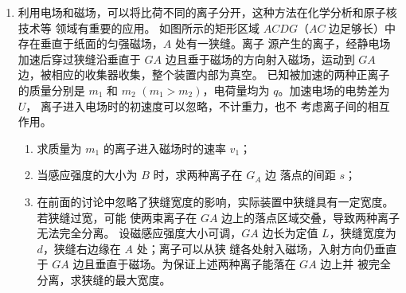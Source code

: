 \begin{enumerate}
\begin{enumerate}
	

\end{enumerate}
\begin{figure}[h!]
	\flushright
	
\end{figure}







\item
{}
利用电场和磁场，可以将比荷不同的离子分开，这种方法在化学分析和原子核技术等
领域有重要的应用。
如图所示的矩形区域 $ ACDG $（$ AC $ 边足够长）中存在垂直于纸面的匀强磁场，$ A $ 处有一狭缝。离子
源产生的离子，经静电场加速后穿过狭缝沿垂直于 $ GA $ 边且垂于磁场的方向射入磁场，运动到 $ GA $
边，被相应的收集器收集，整个装置内部为真空。
已知被加速的两种正离子的质量分别是 $ m_{1} $ 和 $ m_{2} $
$ ( m_{1} > m_{2} ) $，电荷量均为 $ q $。加速电场的电势差为 $ U $，
离子进入电场时的初速度可以忽略，不计重力，也不
考虑离子间的相互作用。
\begin{enumerate}
	\item
求质量为 $ m_{1} $ 的离子进入磁场时的速率 $ v_{1} $；



\item 
当感应强度的大小为 $ B $ 时，求两种离子在 $ G_{A} $ 边
落点的间距 $ s $；

\item 
在前面的讨论中忽略了狭缝宽度的影响，实际装置中狭缝具有一定宽度。若狭缝过宽，可能
使两束离子在 $ GA $ 边上的落点区域交叠，导致两种离子无法完全分离。
设磁感应强度大小可调，$ GA $ 边长为定值 $ L $，狭缝宽度为 $ d $，狭缝右边缘在 $ A $ 处；离子可以从狭
缝各处射入磁场，入射方向仍垂直于 $ GA $ 边且垂直于磁场。为保证上述两种离子能落在 $ GA $ 边上并
被完全分离，求狭缝的最大宽度。
	


\end{enumerate}
\end{enumerate}
